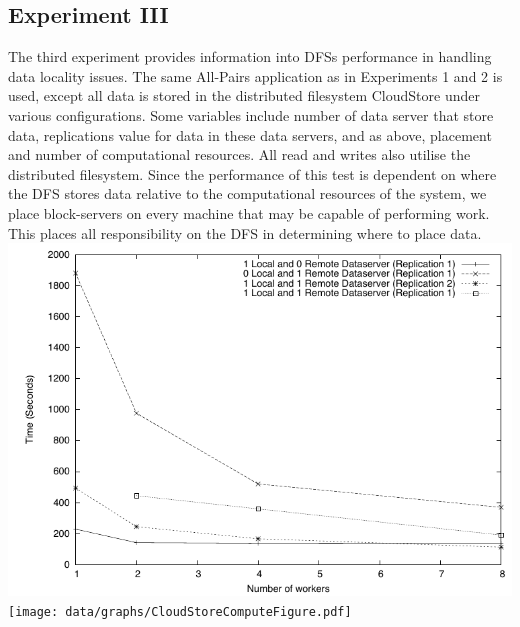 \documentclass{rspublic}
\begin{document}
\subsection{Experiment III} The third experiment provides information
into DFSs performance in handling data locality issues.  The same
All-Pairs application as in Experiments 1 and 2 is used, except all data
is stored in the distributed filesystem CloudStore under various
configurations.  Some variables include number of data server that store
data, replications value for data in these data servers, and as above,
placement and number of computational resources.  All read and writes
also utilise the distributed filesystem.  Since the performance of this
test is dependent on where the DFS stores data relative to the
computational resources of the system, we place block-servers on every
machine that may be capable of performing work.  This places all
responsibility on the DFS in determining where to place data.
\includegraphics[width=\textwidth]{data/graphs/CloudStoreFigure.pdf}
\texttt{[image: data/graphs/CloudStoreComputeFigure.pdf]}
\end{document}
